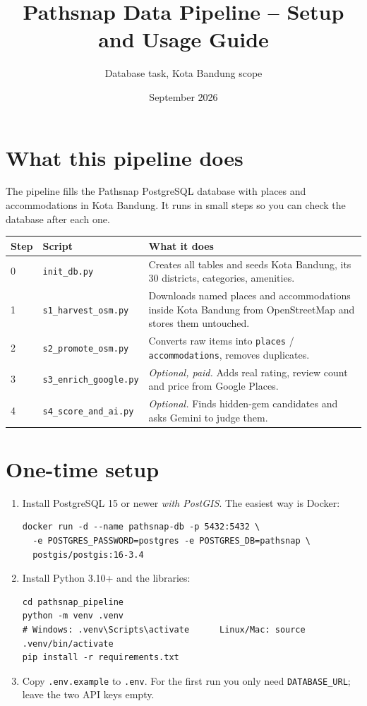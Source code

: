 \documentclass[11pt,a4paper]{article}
\title{Pathsnap Data Pipeline -- Setup and Usage Guide}
\author{Database task, Kota Bandung scope}
\date{September 2026}
\begin{document}
\maketitle

\section{What this pipeline does}
The pipeline fills the Pathsnap PostgreSQL database with places and accommodations in Kota Bandung. It runs in small steps so you can check the database after each one.

\begin{center}
\begin{tabular}{@{}lll@{}}
\toprule
Step & Script & What it does \\
\midrule
0 & \texttt{init\_db.py} & Creates all tables and seeds Kota Bandung, its 30 districts, categories, amenities. \\
1 & \texttt{s1\_harvest\_osm.py} & Downloads named places and accommodations inside Kota Bandung from OpenStreetMap and stores them untouched. \\
2 & \texttt{s2\_promote\_osm.py} & Converts raw items into \texttt{places} / \texttt{accommodations}, removes duplicates. \\
3 & \texttt{s3\_enrich\_google.py} & \emph{Optional, paid.} Adds real rating, review count and price from Google Places. \\
4 & \texttt{s4\_score\_and\_ai.py} & \emph{Optional.} Finds hidden-gem candidates and asks Gemini to judge them. \\
\bottomrule
\end{tabular}
\end{center}

\section{One-time setup}
\begin{enumerate}[leftmargin=*]
\item Install PostgreSQL 15 or newer \emph{with PostGIS}. The easiest way is Docker:
\begin{lstlisting}
docker run -d --name pathsnap-db -p 5432:5432 \
  -e POSTGRES_PASSWORD=postgres -e POSTGRES_DB=pathsnap \
  postgis/postgis:16-3.4
\end{lstlisting}
\item Install Python 3.10+ and the libraries:
\begin{lstlisting}
cd pathsnap_pipeline
python -m venv .venv
# Windows: .venv\Scripts\activate      Linux/Mac: source .venv/bin/activate
pip install -r requirements.txt
\end{lstlisting}
\item Copy \texttt{.env.example} to \texttt{.env}. For the first run you only need \texttt{DATABASE\_URL}; leave the two API keys empty.
\end{enumerate}
\end{document}
